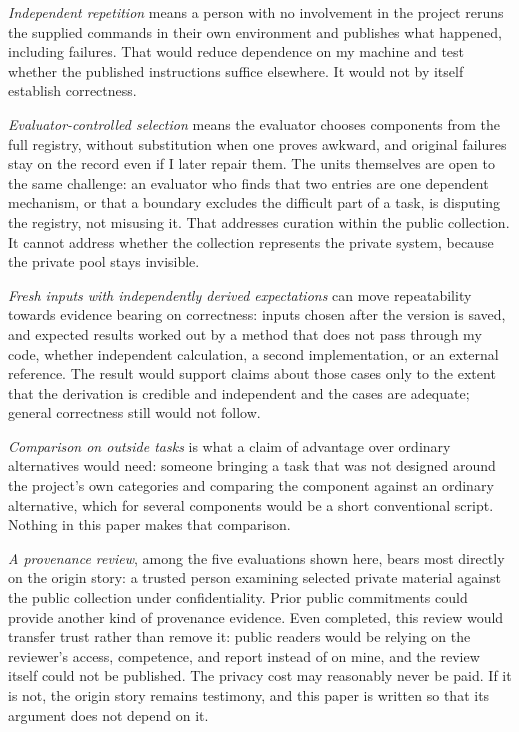 \documentclass[11pt]{article}
\begin{document}
\emph{Independent repetition} means a person with no involvement in the
project reruns the supplied commands in their own environment and publishes
what happened, including failures. That would reduce dependence on my
machine and test whether the published instructions suffice elsewhere. It
would not by itself establish correctness.

\emph{Evaluator-controlled selection} means the evaluator chooses
components from the full registry, without substitution when one proves
awkward, and original failures stay on the record even if I later repair
them. The units themselves are open to the same challenge: an evaluator
who finds that two entries are one dependent mechanism, or that a
boundary excludes the difficult part of a task, is disputing the registry,
not misusing it. That addresses curation within the public collection. It
cannot address whether the collection represents the private system,
because the private pool stays invisible.

\emph{Fresh inputs with independently derived expectations} can move
repeatability towards evidence bearing on correctness: inputs chosen after
the version is saved, and expected results worked out by a method that
does not pass through my code, whether independent calculation, a second
implementation, or an external reference. The result would support claims
about those cases only to the extent that the derivation is credible and
independent and the cases are adequate; general correctness still would not
follow.

\emph{Comparison on outside tasks} is what a claim of advantage over
ordinary alternatives would need: someone bringing a task that was not
designed around the project's own categories and comparing the component
against an ordinary alternative, which for several components would be a
short conventional script. Nothing in this paper makes that comparison.

\emph{A provenance review}, among the five evaluations shown here, bears most
directly on the origin story: a trusted person examining selected private
material against the public collection under confidentiality. Prior public
commitments could provide another kind of provenance evidence. Even
completed, this review would
transfer trust rather than remove it: public readers would be relying on
the reviewer's access, competence, and report instead of on mine, and the
review itself could not be published. The privacy cost may reasonably
never be paid. If it is not, the origin story remains testimony, and this
paper is written so that its argument does not depend on it.
\end{document}
